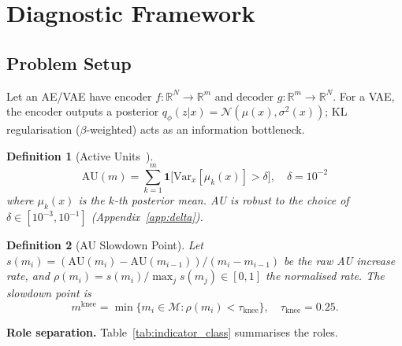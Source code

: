 \documentclass[11pt,a4paper]{article}
\newtheorem{definition}{Definition}
\newcommand{\R}{\mathbb{R}}
\newcommand{\mknee}{m^{\mathrm{knee}}}
\begin{document}
\section{Diagnostic Framework}\label{sec:framework}

\subsection{Problem Setup}\label{sec:framework_setup}

Let an AE/VAE have encoder $f:\R^N\!\to\R^m$ and decoder $g:\R^m\!\to\R^N$.
For a VAE, the encoder outputs a posterior $q_\phi(z|x)=\mathcal{N}(\mu(x),\sigma^2(x))$;
KL regularisation ($\beta$-weighted) acts as an information bottleneck.

\begin{definition}[Active Units~\cite{lucas2019elbo}]
\begin{equation}
  \mathrm{AU}(m)=\sum_{k=1}^{m}\mathbf{1}\bigl[\mathrm{Var}_x[\mu_k(x)]>\delta\bigr],
  \quad\delta=10^{-2}
  \label{eq:au_def}
\end{equation}
where $\mu_k(x)$ is the $k$-th posterior mean.
AU is robust to the choice of $\delta\in[10^{-3},10^{-1}]$ (Appendix~\ref{app:delta}).
\end{definition}

\begin{definition}[AU Slowdown Point]
Let $s(m_i)=({\mathrm{AU}(m_i)-\mathrm{AU}(m_{i-1})})/({m_i-m_{i-1}})$
be the raw AU increase rate, and
$\rho(m_i)=s(m_i)/\max_j s(m_j)\in[0,1]$ the normalised rate.
The slowdown point is
\begin{equation}
  \mknee=\min\{m_i\in\mathcal{M}:\rho(m_i)<\tau_{\mathrm{knee}}\},
  \quad\tau_{\mathrm{knee}}=0.25.
  \label{eq:mknee}
\end{equation}
\end{definition}

\textbf{Role separation.} Table~\ref{tab:indicator_class} summarises the roles.
\end{document}
